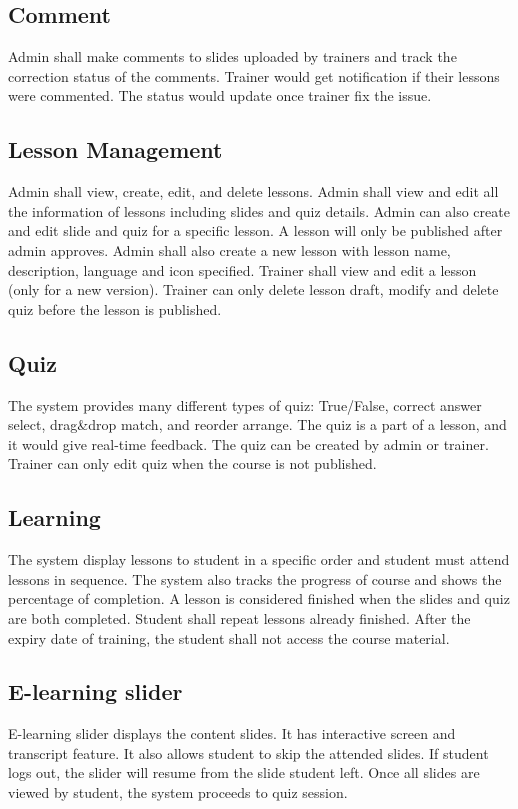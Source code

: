 \documentclass[a4paper]{article}
\begin{document}
\subsection{Comment}
Admin shall make comments to slides uploaded by trainers and track the correction status of the comments.  Trainer would get notification if their lessons were commented. The status would update once trainer fix the issue.
\bigskip
\subsection{Lesson Management}
Admin shall view, create, edit, and delete lessons. Admin shall view and edit all the information of lessons including slides and quiz details. Admin can also create and edit slide and quiz for a specific lesson. A lesson will only be published after admin approves. Admin shall also create a new lesson with lesson name, description, language and icon specified.
Trainer shall view and edit a lesson (only for a new version). Trainer can only delete lesson draft, modify and delete quiz before the lesson is published.
\bigskip
\subsection{Quiz}
The system provides many different types of quiz: True/False, correct answer select, drag\&drop match, and reorder arrange. The quiz is a part of a lesson, and it would give real-time feedback. The quiz can be created by admin or trainer. Trainer can only edit quiz when the course is not published.
\bigskip
\subsection{Learning}
The system display lessons to student in a specific order and student must attend lessons in sequence. The system also tracks the progress of course and shows the percentage of completion. A lesson is considered finished when the slides and quiz are both completed. Student shall repeat lessons already finished. After the expiry date of training, the student shall not access the course material. 
\bigskip
\subsection{E-learning slider}
E-learning slider displays the content slides. It has interactive screen and transcript feature. It also allows student to skip the attended slides. If student logs out, the slider will resume from the slide student left. Once all slides are viewed by student, the system proceeds to quiz session. 
\bigskip
\end{document}
